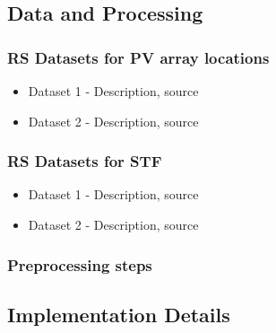\begin{multicols}{2}

\subsection{Data and Processing}
\subsubsection{RS Datasets for PV array locations}
    \begin{itemize}
        \item Dataset 1 - Description, source
        \item Dataset 2 - Description, source
    \end{itemize}
\subsubsection{RS Datasets for STF}
    \begin{itemize}
        \item Dataset 1 - Description, source
        \item Dataset 2 - Description, source
    \end{itemize}
\subsubsection{Preprocessing steps}
    

\subsection{Implementation Details}

\end{multicols}
